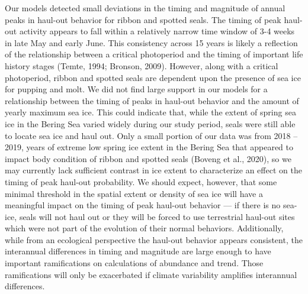 \documentclass[fleqn,10pt,lineno]{wlpeerj} %
\begin{document}
Our models detected small deviations in the timing and magnitude of annual peaks
in haul-out behavior for ribbon and spotted seals. The timing of peak haul-out
activity appears to fall within a relatively narrow time window of 3-4 weeks in
late May and early June. This consistency across 15 years is likely a reflection
of the relationship between a critical photoperiod and the timing of important
life history stages (Temte, 1994; Bronson, 2009). However, along with a critical
photoperiod, ribbon and spotted seals are dependent upon the presence of sea ice
for pupping and molt. We did not find large support in our models for a
relationship between the timing of peaks in haul-out behavior and the amount of
yearly maximum sea ice. This could indicate that, while the extent of spring sea
ice in the Bering Sea varied widely during our study period, seals were still
able to locate sea ice and haul out. Only a small portion of our data was from
2018 -- 2019, years of extreme low spring ice extent in the Bering Sea that
appeared to impact body condition of ribbon and spotted seals (Boveng et al., 2020), so
we may currently lack sufficient contrast in ice extent to characterize an
effect on the timing of peak haul-out probability. We should expect, however,
that some minimal threshold in the spatial extent or density of sea ice will
have a meaningful impact on the timing of peak haul-out behavior --- if there is
no sea-ice, seals will not haul out or they will be forced to use terrestrial
haul-out sites which were not part of the evolution of their normal behaviors.
Additionally, while from an ecological perspective the haul-out behavior appears
consistent, the interannual differences in timing and magnitude are large enough
to have important ramifications on calculations of abundance and trend. Those
ramifications will only be exacerbated if climate variability amplifies
interannual differences.
\end{document}
